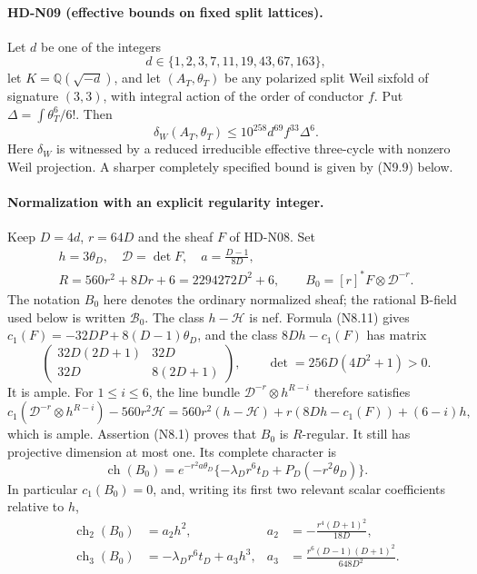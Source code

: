 \paragraph{HD-N09 (effective bounds on fixed split lattices).}
Let $d$ be one of the integers
\[
 d\in\{1,2,3,7,11,19,43,67,163\},
\]
let
$K=\mathbb Q(\sqrt{-d})$, and let $(A_T,\theta_T)$ be any
polarized split Weil sixfold of signature $(3,3)$, with integral
action of the order of conductor $f$. Put
$\Delta=\int\theta_T^6/6!$. Then
\[
 \boxed{\delta_W(A_T,\theta_T)
       \le10^{258}d^{69}f^{33}\Delta^6.}                  \tag{N9.1}
\]
Here $\delta_W$ is witnessed by a reduced irreducible effective
three-cycle with nonzero Weil projection. A sharper completely
specified bound is given by (N9.9) below.

\paragraph{Normalization with an explicit regularity integer.}
Keep $D=4d$, $r=64D$ and the sheaf $F$ of HD-N08. Set
\[
\begin{gathered}
 h=3\theta_D,\quad \mathcal D=\det F,\quad
 a=\frac{D-1}{8D},\\
 R=560r^2+8Dr+6=2294272D^2+6,\qquad
 B_0=[r]^*F\otimes\mathcal D^{-r}.
\end{gathered}                                             \tag{N9.2}
\]
The notation $B_0$ here denotes the ordinary normalized sheaf;
the rational B-field used below is written $\mathcal B_0$.
The class $h-\mathcal H$ is nef. Formula (N8.11) gives
$c_1(F)=-32DP+8(D-1)\theta_D$, and the class
$8Dh-c_1(F)$ has matrix
\[
 \begin{pmatrix}32D(2D+1)&32D\\32D&8(2D+1)\end{pmatrix},
 \qquad\det=256D(4D^2+1)>0.
\]
It is ample. For $1\le i\le6$, the line bundle
$\mathcal D^{-r}\otimes h^{R-i}$ therefore satisfies
\[
 c_1(\mathcal D^{-r}\otimes h^{R-i})-560r^2\mathcal H
 =560r^2(h-\mathcal H)+r(8Dh-c_1(F))+(6-i)h,
\]
which is ample. Assertion (N8.1) proves that $B_0$ is
$R$-regular. It still has projective dimension at most one.
Its complete character is
\[
 \operatorname{ch}(B_0)=e^{-r^2a\theta_D}
       \{-\lambda_Dr^6t_D+P_D(-r^2\theta_D)\}.            \tag{N9.3}
\]
In particular $c_1(B_0)=0$, and, writing its first two relevant
scalar coefficients relative to $h$,
\[
 \begin{aligned}
 \operatorname{ch}_2(B_0)&=a_2h^2,
 &a_2&=-\frac{r^4(D+1)^2}{18D},\\
 \operatorname{ch}_3(B_0)&=-\lambda_Dr^6t_D+a_3h^3,
 &a_3&=\frac{r^6(D-1)(D+1)^2}{648D^2}.
 \end{aligned}                                             \tag{N9.4}
\]

